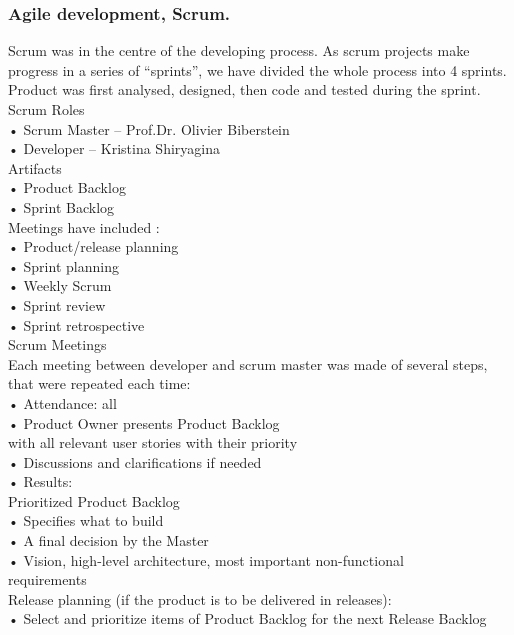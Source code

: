 \documentclass{scrartcl}
\begin{document}
\subsubsection{ Agile development, Scrum.} 
Scrum was in the centre of the developing process.
As scrum projects make progress in a series of “sprints”, we have divided the whole process into
4 sprints. Product was first analysed, designed, then code and tested during the sprint. \\
Scrum
Roles \\
	•	Scrum Master – Prof.Dr. Olivier Biberstein\\
	•	Developer – Kristina Shiryagina\\
 Artifacts \\
	•	Product Backlog\\
	•	Sprint Backlog\\
 Meetings have included :\\
	•	Product/release planning\\
	•	Sprint planning\\
	•	Weekly Scrum\\
	•	Sprint review\\
	•	Sprint retrospective\\
Scrum Meetings \\
Each meeting between developer and scrum master was made of several steps, that were repeated each time:\\
	•	Attendance: all\\
	•	Product Owner presents Product Backlog\\
with all relevant user stories with their priority\\
	•	Discussions and clarifications if needed\\
	•	Results:\\
Prioritized Product Backlog\\
	•	Specifies what to build\\
	•	A final decision by the Master\\
	•	Vision, high-level architecture, most important non-functional\\
requirements\\
Release planning (if the product is to be delivered in releases):\\
	•	Select and prioritize items of Product Backlog for the next Release Backlog \cite{sed}\\
	
	
\end{document}
